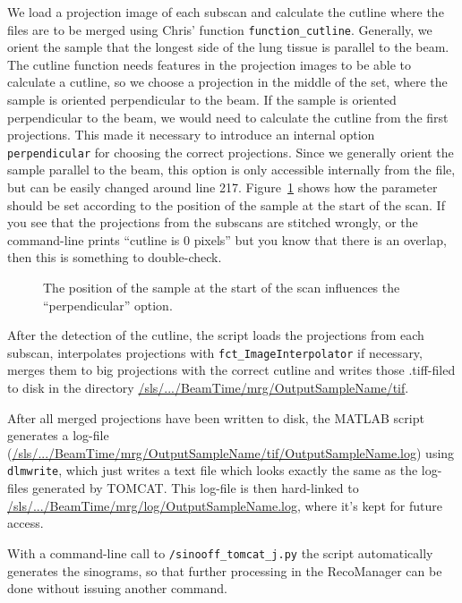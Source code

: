 \documentclass[a4paper]{scrartcl}
\begin{document}
We load a projection image of each subscan and calculate the cutline where the files are to be merged using Chris' function \verb+function_cutline+. Generally, we orient the sample that the longest side of the lung tissue is parallel to the beam. The cutline function needs features in the projection images to be able to calculate a cutline, so we choose a projection in the middle of the set, where the sample is oriented perpendicular to the beam. If the sample is oriented perpendicular to the beam, we would need to calculate the cutline from the first projections. This made it necessary to introduce an internal option \verb+perpendicular+ for choosing the correct projections. Since we generally orient the sample parallel to the beam, this option is only accessible internally from the file, but can be easily changed around line 217. Figure~\ref{fig:perpendicular} shows how the parameter should be set according to the position of the sample at the start of the scan. If you see that the projections from the subscans are stitched wrongly, or the command-line prints ``cutline is 0 pixels'' but you know that there is an overlap, then this is something to double-check.

\begin{figure}[htp]%
	\centering
	\subfloat[perpendicular=0, standard]{%
		}%
	\hfill%
	\subfloat[change option to ``perpendicular=1'']{%
		}%
	\caption{The position of the sample at the start of the scan influences the ``perpendicular'' option.}%
	\label{fig:perpendicular}%
\end{figure}

After the detection of the cutline, the script loads the projections from each subscan, interpolates projections with \verb+fct_ImageInterpolator+ if necessary, merges them to big projections with the correct cutline and writes those .tiff-filed to disk in the directory \url{/sls/.../BeamTime/mrg/OutputSampleName/tif}.

After all merged projections have been written to disk, the MATLAB script generates a log-file (\url{/sls/.../BeamTime/mrg/OutputSampleName/tif/OutputSampleName.log}) using \verb+dlmwrite+, which just writes a text file which looks exactly the same as the log-files generated by TOMCAT. This log-file is then hard-linked to \url{/sls/.../BeamTime/mrg/log/OutputSampleName.log}, where it's kept for future access.

With a command-line call to \verb+/sinooff_tomcat_j.py+ the script automatically generates the sinograms, so that further processing in the RecoManager can be done without issuing another command.
\end{document}
